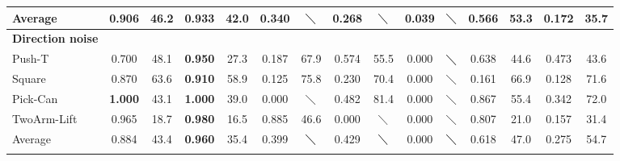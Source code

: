 \begin{table*}[t!]
\begin{center}
\begin{tabular}{lcccccccccc|cccc}
Average & 0.906 & 46.2 & \textbf{0.933} &  42.0 &  0.340 & $\diagdown$ & 0.268  & $\diagdown$  & 0.039 & $\diagdown$ & 0.566 & 53.3 & 0.172& 35.7 \\
\hline
\textbf{Direction noise }   && & & & & & & & & & && & \\
Push-T & 0.700 & 48.1 &  \textbf{0.950} & 27.3  & 0.187 & 67.9 & 0.574 & 55.5 & 0.000  &  $\diagdown$ & 0.638 & 44.6 & 0.473 & 43.6 \\
Square & 0.870 & 63.6 &  \textbf{0.910} & 58.9 & 0.125 & 75.8 & 0.230 & 70.4 & 0.000  &  $\diagdown$ & 0.161 & 66.9 & 0.128 & 71.6 \\
Pick-Can & \textbf{1.000} & 43.1 & \textbf{1.000} &  39.0 &   0.000  & $\diagdown$   & 0.482 & 81.4 & 0.000  & $\diagdown$  & 0.867 & 55.4 & 0.342 & 72.0 \\
TwoArm-Lift & 0.965 & 18.7 & \textbf{0.980} & 16.5  & 0.885 & 46.6 &   0.000 & $\diagdown$   &   0.000  & $\diagdown$   & 0.807 & 21.0 & 0.157 & 31.4 \\
\hline
Average & 0.884 & 43.4 &    \textbf{0.960} & 35.4 & 0.399  & $\diagdown$  & 0.429 & $\diagdown$ & 0.000 & $\diagdown$ &  0.618& 47.0 & 0.275 &  54.7 \\
\Xhline{0.75pt}
\end{tabular}
\end{center}
\end{table*}
